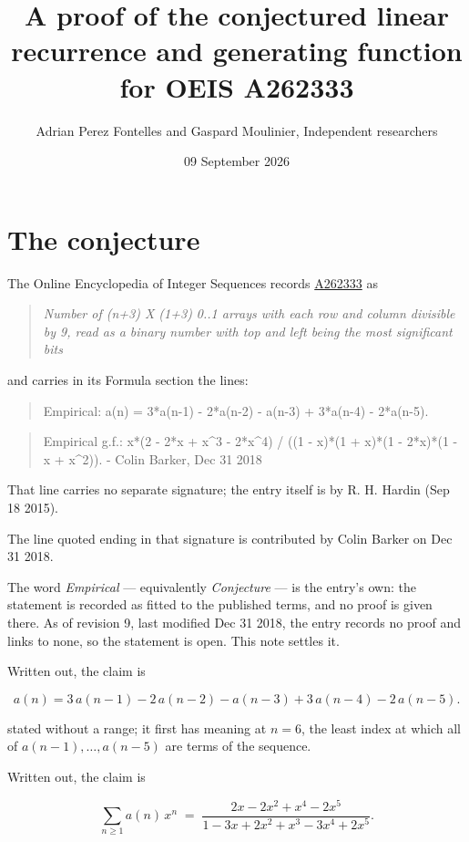 \documentclass[11pt]{article}
\title{A proof of the conjectured linear recurrence and generating function for OEIS A262333}
\author{Adrian Perez Fontelles and Gaspard Moulinier, Independent researchers}
\date{09 September 2026}
\theoremstyle{definition}
\begin{document}
\maketitle
\section{The conjecture}

The Online Encyclopedia of Integer Sequences records \href{https://oeis.org/A262333}{A262333} as

\begin{quote}\itshape Number of (n+3) X (1+3) 0..1 arrays with each row and column divisible by 9, read as a binary number with top and left being the most significant bits\end{quote}

and carries in its Formula section the lines:

\begin{quote}\ttfamily Empirical: a(n) = 3*a(n-1) - 2*a(n-2) - a(n-3) + 3*a(n-4) - 2*a(n-5).\end{quote}

\begin{quote}\ttfamily Empirical g.f.: x*(2 - 2*x + x\textasciicircum{}3 - 2*x\textasciicircum{}4) / ((1 - x)*(1 + x)*(1 - 2*x)*(1 - x + x\textasciicircum{}2)). - Colin Barker, Dec 31 2018\end{quote}

That line carries no separate signature; the entry itself is by R. H. Hardin (Sep 18 2015).

The line quoted ending in that signature is contributed by Colin Barker on Dec 31 2018.

The word {\itshape Empirical} --- equivalently {\itshape Conjecture} --- is the entry's own: the statement is recorded as fitted to the published terms, and no proof is given there. As of revision 9, last modified Dec 31 2018, the entry records no proof and links to none, so the statement is open. This note settles it.

Written out, the claim is

\[a(n) = 3\,a(n-1) - 2\,a(n-2) - a(n-3) + 3\,a(n-4) - 2\,a(n-5).\]

stated without a range; it first has meaning at $n = 6$, the least index at which all of $a(n-1),\dots,a(n-5)$ are terms of the sequence.

Written out, the claim is

\[\sum_{n \ge 1} a(n)\,x^n \;=\; \frac{2x - 2x^{2} + x^{4} - 2x^{5}}{1 - 3x + 2x^{2} + x^{3} - 3x^{4} + 2x^{5}}.\]
\end{document}
